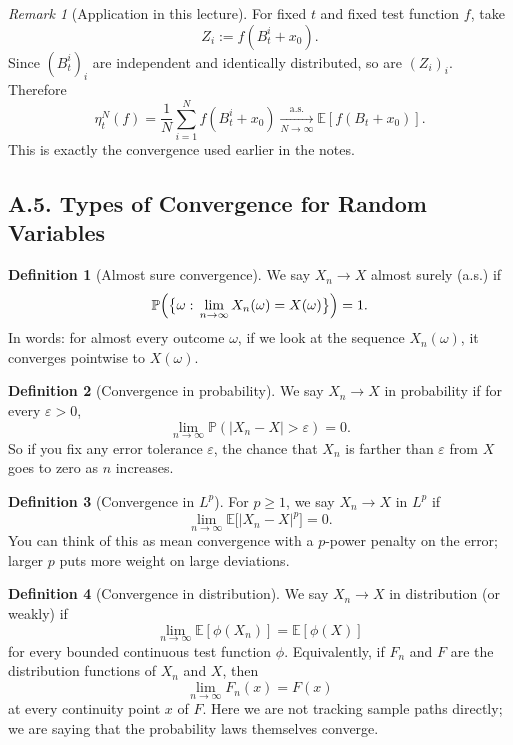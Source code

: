 \documentclass[11pt]{article}
\theoremstyle{definition}
\newtheorem{definition}{Definition}
\theoremstyle{remark}
\newtheorem{remark}{Remark}
\begin{document}
\begin{remark}[Application in this lecture]
For fixed $t$ and fixed test function $f$, take
\[
Z_i:=f(B_t^i+x_0).
\]
Since $(B_t^i)_i$ are independent and identically distributed, so are $(Z_i)_i$. Therefore
\[
\eta_t^N(f)
=
\frac{1}{N}\sum_{i=1}^N f(B_t^i+x_0)
\xrightarrow[N\to\infty]{\text{a.s.}}
\mathbb E[f(B_t+x_0)].
\]
This is exactly the convergence used earlier in the notes.
\end{remark}

\subsection*{A.5. Types of Convergence for Random Variables}
\begin{definition}[Almost sure convergence]
We say $X_n\to X$ almost surely (a.s.) if
\[
\mathbb P\Bigl(\bigl\{\omega:\,\lim_{n\to\infty}X_n(\omega)=X(\omega)\bigr\}\Bigr)=1.
\]
In words: for almost every outcome $\omega$, if we look at the sequence $X_n(\omega)$, it converges pointwise to $X(\omega)$.
\end{definition}

\begin{definition}[Convergence in probability]
We say $X_n\to X$ in probability if for every $\varepsilon>0$,
\[
\lim_{n\to\infty}\mathbb P(|X_n-X|>\varepsilon)=0.
\]
So if you fix any error tolerance $\varepsilon$, the chance that $X_n$ is farther than $\varepsilon$ from $X$ goes to zero as $n$ increases.
\end{definition}

\begin{definition}[Convergence in $L^p$]
For $p\ge1$, we say $X_n\to X$ in $L^p$ if
\[
\lim_{n\to\infty}\mathbb E\bigl[|X_n-X|^p\bigr]=0.
\]
You can think of this as mean convergence with a $p$-power penalty on the error; larger $p$ puts more weight on large deviations.
\end{definition}

\begin{definition}[Convergence in distribution]
We say $X_n\to X$ in distribution (or weakly) if
\[
\lim_{n\to\infty}\mathbb E[\phi(X_n)]=\mathbb E[\phi(X)]
\]
for every bounded continuous test function $\phi$.
Equivalently, if $F_n$ and $F$ are the distribution functions of $X_n$ and $X$, then
\[
\lim_{n\to\infty}F_n(x)=F(x)
\]
at every continuity point $x$ of $F$. Here we are not tracking sample paths directly; we are saying that the probability laws themselves converge.
\end{definition}
\end{document}
